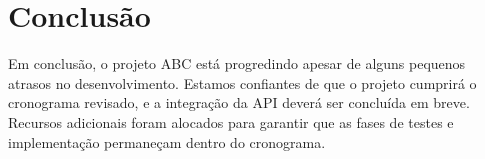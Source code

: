\documentclass[12pt]{article}
\begin{document}
\section{Conclusão}
Em conclusão, o projeto ABC está progredindo apesar de alguns pequenos atrasos no desenvolvimento. Estamos confiantes de que o projeto cumprirá o cronograma revisado, e a integração da API deverá ser concluída em breve. Recursos adicionais foram alocados para garantir que as fases de testes e implementação permaneçam dentro do cronograma.
\end{document}
